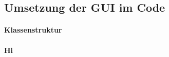 \subsection{Umsetzung der GUI im Code}\label{tkintercode}
\paragraph{Klassenstruktur}


\paragraph{Hi}